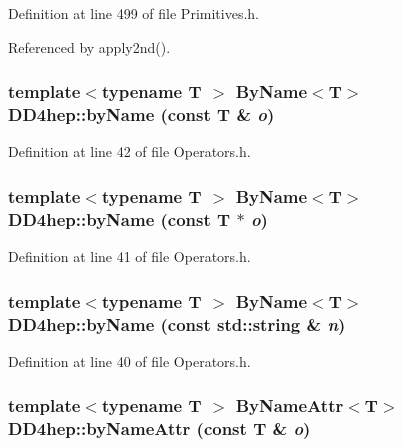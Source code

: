 Definition at line 499 of file Primitives.h.

Referenced by apply2nd().\hypertarget{namespace_d_d4hep_a2f0a44ccb3cbef396a2f187badd0df2b}{
\subsubsection[{byName}]{\setlength{\rightskip}{0pt plus 5cm}template$<$typename T $>$ {\bf ByName}$<${\bf T}$>$ DD4hep::byName (const {\bf T} \& {\em o})}}
\label{namespace_d_d4hep_a2f0a44ccb3cbef396a2f187badd0df2b}


Definition at line 42 of file Operators.h.\hypertarget{namespace_d_d4hep_a2f4f342ca703865e2766a2d0e6bd9782}{
\subsubsection[{byName}]{\setlength{\rightskip}{0pt plus 5cm}template$<$typename T $>$ {\bf ByName}$<${\bf T}$>$ DD4hep::byName (const {\bf T} $\ast$ {\em o})}}
\label{namespace_d_d4hep_a2f4f342ca703865e2766a2d0e6bd9782}


Definition at line 41 of file Operators.h.\hypertarget{namespace_d_d4hep_add0e9e6b24b53d86a3e91acad797a225}{
\subsubsection[{byName}]{\setlength{\rightskip}{0pt plus 5cm}template$<$typename T $>$ {\bf ByName}$<${\bf T}$>$ DD4hep::byName (const std::string \& {\em n})}}
\label{namespace_d_d4hep_add0e9e6b24b53d86a3e91acad797a225}


Definition at line 40 of file Operators.h.\hypertarget{namespace_d_d4hep_ac813b4ed0fa08e81ac4246e946629816}{
\subsubsection[{byNameAttr}]{\setlength{\rightskip}{0pt plus 5cm}template$<$typename T $>$ {\bf ByNameAttr}$<${\bf T}$>$ DD4hep::byNameAttr (const {\bf T} \& {\em o})}}
\label{namespace_d_d4hep_ac813b4ed0fa08e81ac4246e946629816}


